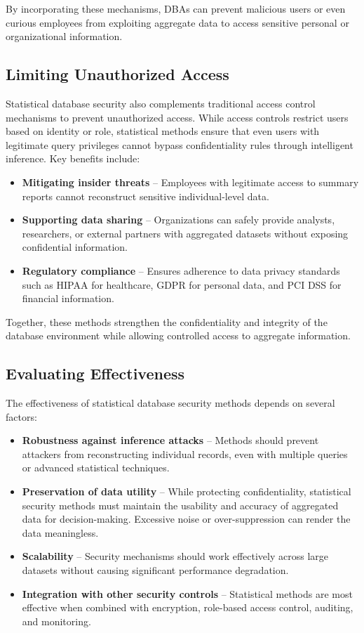 \documentclass[12pt,a4paper]{article}
\begin{document}
By incorporating these mechanisms, DBAs can prevent malicious users or even curious employees from exploiting aggregate data to access sensitive personal or organizational information.

\subsection{Limiting Unauthorized Access}

Statistical database security also complements traditional access control mechanisms to prevent unauthorized access. While access controls restrict users based on identity or role, statistical methods ensure that even users with legitimate query privileges cannot bypass confidentiality rules through intelligent inference. Key benefits include:

\begin{itemize}
  \item \textbf{Mitigating insider threats} -- Employees with legitimate access to summary reports cannot reconstruct sensitive individual-level data.
  \item \textbf{Supporting data sharing} -- Organizations can safely provide analysts, researchers, or external partners with aggregated datasets without exposing confidential information.
  \item \textbf{Regulatory compliance} -- Ensures adherence to data privacy standards such as HIPAA for healthcare, GDPR for personal data, and PCI DSS for financial information.
\end{itemize}

Together, these methods strengthen the confidentiality and integrity of the database environment while allowing controlled access to aggregate information.

\subsection{Evaluating Effectiveness}

The effectiveness of statistical database security methods depends on several factors:

\begin{itemize}
  \item \textbf{Robustness against inference attacks} -- Methods should prevent attackers from reconstructing individual records, even with multiple queries or advanced statistical techniques.
  \item \textbf{Preservation of data utility} -- While protecting confidentiality, statistical security methods must maintain the usability and accuracy of aggregated data for decision-making. Excessive noise or over-suppression can render the data meaningless.
  \item \textbf{Scalability} -- Security mechanisms should work effectively across large datasets without causing significant performance degradation.
  \item \textbf{Integration with other security controls} -- Statistical methods are most effective when combined with encryption, role-based access control, auditing, and monitoring.
\end{itemize}
\end{document}
